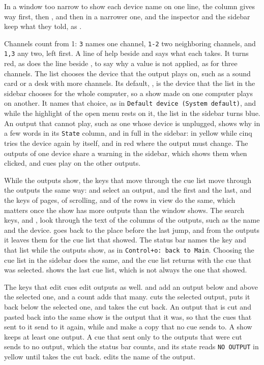 In a window too narrow to show each device name on one line, the
 column gives way first, then , and then
 in a narrower one, and the inspector and the sidebar keep what
they told, as .

Channels count from 1: \texttt{3} names one channel, \texttt{1-2} two
neighboring channels, and \texttt{1,3} any two, left first.  A line of help
beside  and  says what each takes.  It turns
red, as does the line beside , to say why a value is not applied, as
for three channels.  The  list chooses the device that the output
plays on, such as a sound card or a desk with more channels.  Its default,
, is the device that the  list in the
sidebar chooses for the whole computer, so a show made on one computer plays
on another.  It names that choice, as in
\texttt{Default device (System default)}, and while the highlight of the open
menu rests on it, the list in the sidebar turns blue.  An output that cannot
play, such as one whose device is unplugged, shows why in a few words in its
\texttt{State} column, and in full in the sidebar: in yellow while cinq tries
the device again by itself, and in red where the output must change.  The
outputs of one device share a warning in the sidebar, which shows them when
clicked, and cues play on the other outputs.

While the outputs show, the keys that move through the cue list move through
the outputs the same way:  and  select an output,  and
 the first and the last, and the keys of pages, of scrolling, and of the
rows in view do the same, which matters once the show has more outputs than
the window shows.  The search keys, \key{/} and , look through the text
of the columns of the outputs, such as the name and the device.
 goes back to the place before the last jump, and from the
outputs it leaves them for the cue list that showed.  The status bar names the
key and that list while the outputs show, as in
\texttt{Control+o: back to Main}.  Choosing the cue list in the sidebar does
the same, and the cue list returns with the cue that was selected.  
shows the last cue list, which is not always the one that showed.

The keys that edit cues edit outputs as well.   and  add an
output below and above the selected one, and a count adds that many.  
cuts the selected output,  puts it back below the selected one, and
 takes the cut back.  An output that is cut and pasted back into the
same show is the output that it was, so that the cues that sent to it send to
it again, while  and  make a copy that no cue sends to.  A show
keeps at least one output.  A cue that sent only to the outputs that were cut
sends to no output, which the status bar counts, and its state reads
\texttt{NO OUTPUT} in yellow until  takes the cut back.   edits
the name of the output.

